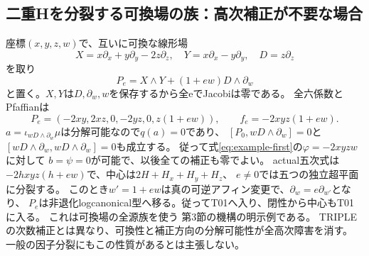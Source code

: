 \subsection{二重Hを分裂する可換場の族：高次補正が不要な場合}
座標$(x,y,z,w)$で、互いに可換な線形場
\[
 X=x\partial_x+y\partial_y-2z\partial_z,\quad
 Y=x\partial_x-y\partial_y,\quad D=z\partial_z
\]
を取り
\[
 P_e=X\wedge Y+(1+ew)D\wedge\partial_w
\]
と置く。$X,Y$は$D,\partial_w,w$を保存するから全eでJacobiは零である。
全六係数とPfaffianは
\[
 P_e=(-2xy,2xz,0,-2yz,0,z(1+ew)),\qquad
 f_e=-2xyz(1+ew).
\]
$a=\iota_{wD\wedge\partial_w}\mu$は分解可能なので$q(a)=0$であり、
$[P_0,wD\wedge\partial_w]=0$と$[wD\wedge\partial_w,wD\wedge\partial_w]=0$も成立する。
従って式\eqref{eq:example-first}の$\varphi=-2xyzw$に対して
$b=\psi=0$が可能で、以後全ての補正も零でよい。
actual五次式は$-2hxyz(h+ew)$で、中心は$2H+H_x+H_y+H_z$、
$e\ne0$では五つの独立超平面に分裂する。
このとき$w'=1+ew$は真の可逆アフィン変更で、$\partial_w=e\partial_{w'}$となり、
$P_e$は非退化logcanonical型へ移る。従ってT01へ入り、閉性から中心もT01に入る。
これは可換場の全源族を使う
第3節の機構の明示例である。
TRIPLEの次数補正とは異なり、可換性と補正方向の分解可能性が全高次障害を消す。
一般の因子分裂にもこの性質があるとは主張しない。
